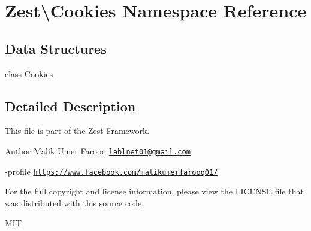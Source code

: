 \hypertarget{namespace_zest_1_1_cookies}{}\section{Zest\textbackslash{}Cookies Namespace Reference}
\label{namespace_zest_1_1_cookies}
\subsection*{Data Structures}
\begin{DoxyCompactItemize}
\item 
class \mbox{\hyperlink{class_zest_1_1_cookies_1_1_cookies}{Cookies}}
\end{DoxyCompactItemize}


\subsection{Detailed Description}
This file is part of the Zest Framework.

\begin{DoxyAuthor}{Author}
Malik Umer Farooq \href{mailto:lablnet01@gmail.com}{\tt lablnet01@gmail.\+com} 

-\/profile \href{https://www.facebook.com/malikumerfarooq01/}{\tt https\+://www.\+facebook.\+com/malikumerfarooq01/}
\end{DoxyAuthor}
For the full copyright and license information, please view the L\+I\+C\+E\+N\+SE file that was distributed with this source code.

M\+IT 